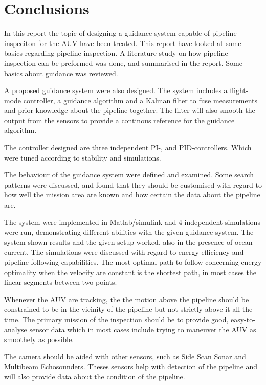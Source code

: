 \chapter{Conclusions}
	In this report the topic of designing a guidance system capable of pipeline inspeciton 
	for the \hugin AUV have been treated. This report have looked at some basics regarding pipeline
	inspection. A literature study on how pipeline inspection can be preformed was done, and summarised in
	the report. Some basics about guidance was reviewed.

	A proposed guidance system were also designed. The system includes a flight-mode controller, a
	guidance algorithm and a Kalman filter to fuse measurements and prior knowledge about the pipeline
	together. The filter will also smooth the output from the sensors to provide a continous reference for
	the guidance algorithm. 

	The controller designed are three independent PI-, and PID-controllers. Which were tuned according to
	stability and simulations.

	The behaviour of the guidance system were defined and examined. Some search patterns were discussed,
	and found that they should be customised with regard to how well the mission area are known and how
	certain the data about the pipeline are. 
	
	The system were implemented in Matlab/simulink and 4 independent simulations were run, demonstrating
	different abilities with the given guidance system. The system shown results and the given setup
	worked, also in the presence of ocean current. The simulations were discussed with regard to energy
	efficiency and pipeline following capabilities. The most optimal path to follow concerning energy
	optimality when the velocity are constant is the shortest path, in most cases the linear segments
	between two points. 
	
	Whenever the AUV are tracking, the the motion above the pipeline should be constrained to be in the
	vicinity of the pipeline but not strictly above it all the time. The primary mission of the inspection
	should be to provide good, easy-to-analyse sensor data which in most cases include trying to maneuver 
	the AUV as smoothely as possible. 

	The camera should be aided with other sensors, such as Side Scan Sonar and Multibeam Echosounders.
	Theses sensors help with detection of the pipeline and will also provide data about the condition of
	the pipeline. 

